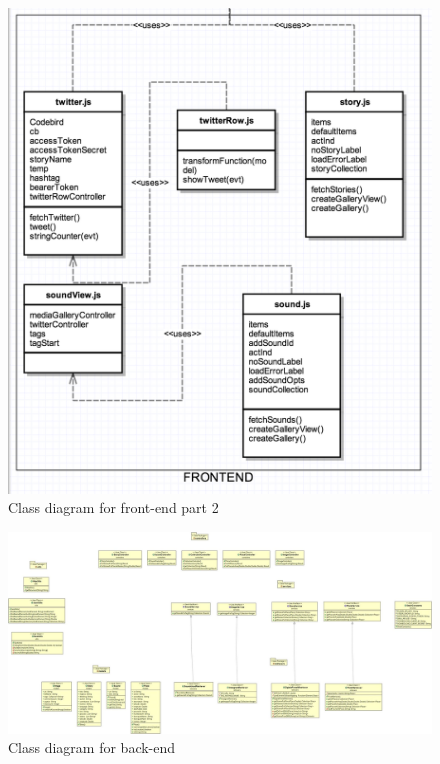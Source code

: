 \documentclass[12pt,a4paper,titlepage]{article}
\begin{document}
\begin{figure}[!h]
\centering
\includegraphics[width=1 \textwidth] {classFront2.png}
\caption{Class diagram for front-end part 2}
\end{figure}

\begin{figure}[!h]
\centering
\includegraphics[width=1.3\textwidth, angle=270] {classBack.jpg}
\caption{Class diagram for back-end}
\end{figure}

\clearpage
\thispagestyle{plain}
\printbibheading
\printbibliography[type=book,heading=subbibliography,title={Book Sources}]
\printbibliography[nottype=book,heading=subbibliography,title={Other Sources}]
\clearpage
\end{document}
